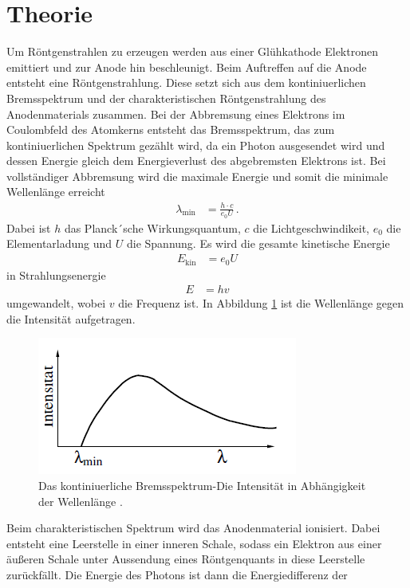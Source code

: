 \section{Theorie}
Um Röntgenstrahlen zu erzeugen werden aus einer Glühkathode
Elektronen emittiert und zur Anode hin beschleunigt. Beim Auftreffen auf die
Anode entsteht eine Röntgenstrahlung. Diese setzt sich aus dem 
kontiniuerlichen Bremsspektrum und der charakteristischen Röntgenstrahlung
des Anodenmaterials zusammen.
Bei der Abbremsung eines Elektrons im Coulombfeld des
Atomkerns entsteht das Bremsspektrum, das zum kontiniuerlichen Spektrum gezählt wird, da
ein Photon ausgesendet wird und dessen Energie gleich dem Energieverlust des abgebremsten
Elektrons ist. Bei vollständiger Abbremsung wird die maximale Energie und somit die 
minimale Wellenlänge erreicht
\begin{align}
\lambda_{\text{min}} &= \frac{h \cdot c}{e_0U} \,.
\end{align}
Dabei ist $h$ das Planck´sche Wirkungsquantum, $c$ die Lichtgeschwindikeit, $e_0$ die Elementarladung
und $U$ die Spannung.
Es wird die gesamte kinetische Energie
\begin{align*}
    E_{\text{kin}} &= e_0U
\end{align*}
in Strahlungsenergie 
\begin{align*}
    E &= hv 
\end{align*}
umgewandelt, wobei $v$ die Frequenz ist. In Abbildung \ref{fig:kontiSpektrum1}
ist die Wellenlänge gegen die Intensität aufgetragen.
\begin{figure}[H]
    \centering
    \includegraphics{kontiSpektrum.png}
    \caption{Das kontiniuerliche Bremsspektrum-Die Intensität in Abhängigkeit der Wellenlänge \protect\cite{AL}.} 
    \label{fig:kontiSpektrum1}
\end{figure}Beim charakteristischen Spektrum wird das Anodenmaterial ionisiert.
Dabei entsteht eine Leerstelle in einer inneren Schale, sodass ein Elektron
aus einer äußeren Schale unter Aussendung eines Röntgenquants in diese 
Leerstelle zurückfällt. Die Energie des Photons ist dann die Energiedifferenz der
